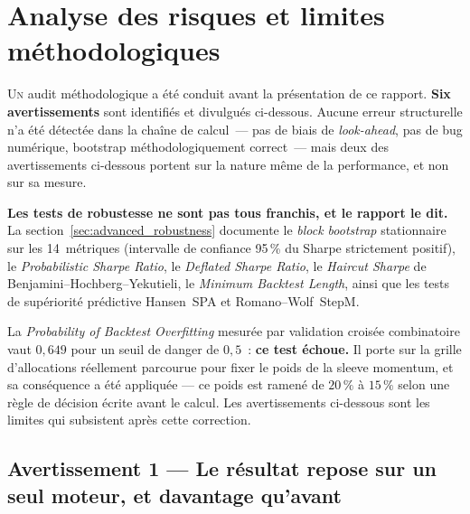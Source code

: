 \section{Analyse des risques et limites méthodologiques}
\label{sec:limitations}

\lettrine[lines=2, findent=2pt, nindent=0pt]{U}{n} audit méthodologique a été conduit avant la présentation de ce rapport. \textbf{Six avertissements} sont identifiés et divulgués ci-dessous. Aucune erreur structurelle n'a été détectée dans la chaîne de calcul~--- pas de biais de \emph{look-ahead}, pas de bug numérique, bootstrap méthodologiquement correct~--- mais deux des avertissements ci-dessous portent sur la nature même de la performance, et non sur sa mesure.

\begin{thesisbox}
\textbf{Les tests de robustesse ne sont pas tous franchis, et le rapport le dit.} La section~\ref{sec:advanced_robustness} documente le \emph{block bootstrap} stationnaire sur les 14~métriques (intervalle de confiance 95\,\% du Sharpe strictement positif), le \textit{Probabilistic Sharpe Ratio}, le \textit{Deflated Sharpe Ratio}, le \textit{Haircut Sharpe} de Benjamini--Hochberg--Yekutieli, le \textit{Minimum Backtest Length}, ainsi que les tests de supériorité prédictive Hansen~SPA et Romano--Wolf~StepM.

La \textit{Probability of Backtest Overfitting} mesurée par validation croisée combinatoire vaut $0{,}649$ pour un seuil de danger de $0{,}5$~: \textbf{ce test échoue.} Il porte sur la grille d'allocations réellement parcourue pour fixer le poids de la sleeve momentum, et sa conséquence a été appliquée --- ce poids est ramené de $20\,\%$ à $15\,\%$ selon une règle de décision écrite avant le calcul. Les avertissements ci-dessous sont les limites qui subsistent après cette correction.
\end{thesisbox}

\subsection{Avertissement 1 --- Le résultat repose sur un seul moteur, et davantage qu'avant}


